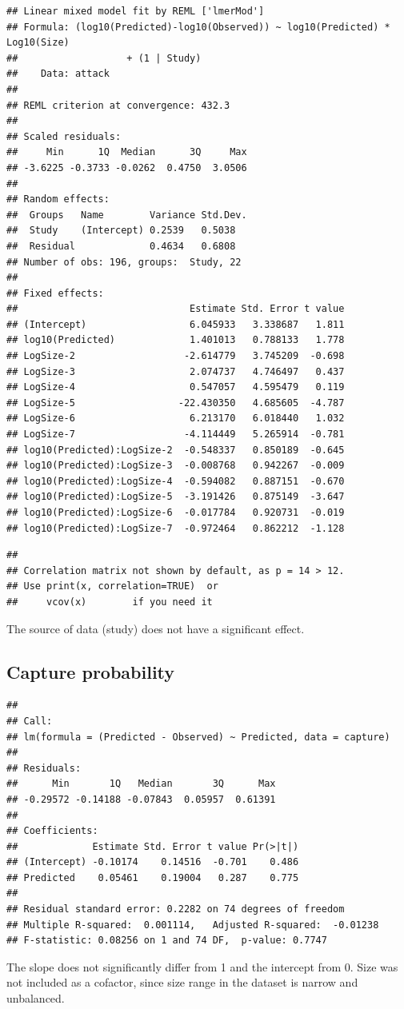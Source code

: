 \documentclass[utf8, 12 pt]{frontiers_suppmat}
\begin{document}
\begin{verbatim}
## Linear mixed model fit by REML ['lmerMod']
## Formula: (log10(Predicted)-log10(Observed)) ~ log10(Predicted) * Log10(Size)
##                   + (1 | Study)
##    Data: attack
## 
## REML criterion at convergence: 432.3
## 
## Scaled residuals: 
##     Min      1Q  Median      3Q     Max 
## -3.6225 -0.3733 -0.0262  0.4750  3.0506 
## 
## Random effects:
##  Groups   Name        Variance Std.Dev.
##  Study    (Intercept) 0.2539   0.5038  
##  Residual             0.4634   0.6808  
## Number of obs: 196, groups:  Study, 22
## 
## Fixed effects:
##                              Estimate Std. Error t value
## (Intercept)                  6.045933   3.338687   1.811
## log10(Predicted)             1.401013   0.788133   1.778
## LogSize-2                   -2.614779   3.745209  -0.698
## LogSize-3                    2.074737   4.746497   0.437
## LogSize-4                    0.547057   4.595479   0.119
## LogSize-5                  -22.430350   4.685605  -4.787
## LogSize-6                    6.213170   6.018440   1.032
## LogSize-7                   -4.114449   5.265914  -0.781
## log10(Predicted):LogSize-2  -0.548337   0.850189  -0.645
## log10(Predicted):LogSize-3  -0.008768   0.942267  -0.009
## log10(Predicted):LogSize-4  -0.594082   0.887151  -0.670
## log10(Predicted):LogSize-5  -3.191426   0.875149  -3.647
## log10(Predicted):LogSize-6  -0.017784   0.920731  -0.019
## log10(Predicted):LogSize-7  -0.972464   0.862212  -1.128
\end{verbatim}

\begin{verbatim}
## 
## Correlation matrix not shown by default, as p = 14 > 12.
## Use print(x, correlation=TRUE)  or
##     vcov(x)        if you need it
\end{verbatim}
The source of data (study) does not have a significant effect.
\par
\vspace{0.3 cm}

\hypertarget{capture-probability}{%
\subsection{Capture probability}\label{capture-probability}}

\begin{verbatim}
## 
## Call:
## lm(formula = (Predicted - Observed) ~ Predicted, data = capture)
## 
## Residuals:
##      Min       1Q   Median       3Q      Max 
## -0.29572 -0.14188 -0.07843  0.05957  0.61391 
## 
## Coefficients:
##             Estimate Std. Error t value Pr(>|t|)
## (Intercept) -0.10174    0.14516  -0.701    0.486
## Predicted    0.05461    0.19004   0.287    0.775
## 
## Residual standard error: 0.2282 on 74 degrees of freedom
## Multiple R-squared:  0.001114,   Adjusted R-squared:  -0.01238 
## F-statistic: 0.08256 on 1 and 74 DF,  p-value: 0.7747
\end{verbatim}
The slope does not significantly differ from 1 and the intercept from 0.
Size was not included as a cofactor, since size range in the dataset is
narrow and unbalanced.
\par
\vspace{0.3 cm}
\end{document}
